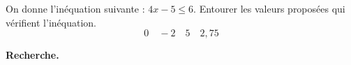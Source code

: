 
On donne l'inéquation suivante : $4x - 5 \leq 6$. Entourer les valeurs proposées qui vérifient l'inéquation. $$ 0 \quad -2 \quad 5 \quad 2,75 $$

\textbf{Recherche.}




